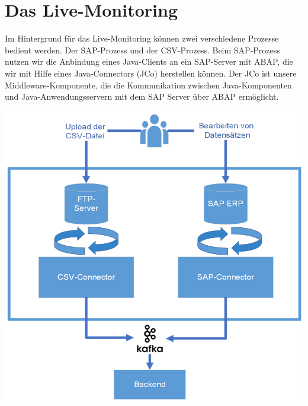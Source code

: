 \section*{Das Live-Monitoring}
Im Hintergrund für das Live-Monitoring können zwei verschiedene Prozesse bedient werden. Der SAP-Prozess und der CSV-Prozess.
\newline
\newline
Beim SAP-Prozess nutzen wir die Anbindung eines Java-Clients an ein SAP-Server mit ABAP, die wir mit Hilfe eines Java-Connectors (JCo) herstellen können. Der JCo ist unsere Middleware-Komponente, die die Kommunikation zwischen Java-Komponenten und Java-Anwendungsservern mit dem SAP Server über ABAP ermöglicht.

\includegraphics[width=\linewidth]{src/abbildungen/architektur_connector.png}
\newline
{}
\newline

